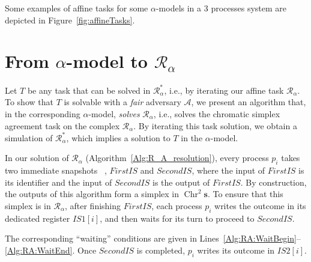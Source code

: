 \documentclass[a4paper]{article}
\newcommand{\remove}[1]{}
\def\A{\ensuremath{\mathcal{A}}}
\def\R{\ensuremath{\mathcal{R}}}
\def\fair{\textit{fair}}
\def\s {\mathbf{s}}
\def\Chr{\operatorname{Chr}}
\begin{document}
Some examples of affine tasks for some $\alpha$-models 
in a 3 processes system are depicted in Figure~\ref{fig:affineTasks}.


\section{From $\alpha$-model to $\R_{\alpha}$} %
\label{sec:R}

Let $T$ be any task that can be solved in $\R_{\alpha}^*$, i.e.,
by iterating our affine task $\R_{\alpha}$.
To show that $T$ is solvable with a {\fair} adversary $\A$, we present
an algorithm that,  in the corresponding
$\alpha$-model, \emph{solves} $\R_{\alpha}$, i.e.,        
solves the chromatic simplex agreement task
on the complex $\R_{\alpha}$.
%
By iterating this task solution, we obtain a simulation of
$\R_{\alpha}^*$, which implies a solution to $T$ in the $\alpha$-model.


In our solution of $\R_{\alpha}$ (Algorithm~\ref{Alg:R_A_resolution}),
every process $p_i$ takes two immediate snapshots ~\cite{BG97},
$\mathit{FirstIS}$ and $\mathit{SecondIS}$, where the input of $\mathit{FirstIS}$ is its identifier and the input of $\mathit{SecondIS}$ is the output of $\mathit{FirstIS}$.
%
By construction, the outputs of this algorithm form a simplex in
$\Chr^2\s$. To ensure that this simplex is in $\R_{\alpha}$,
after finishing $\mathit{FirstIS}$, each process $p_i$ writes the outcome in its dedicated register
$\mathit{IS1}[i]$, and then waits for its turn to proceed to 
$\mathit{SecondIS}$.
%
\remove{
processes execute a first immediate snapshot, 
share their immediate snapshot output and then wait their 
``turn'' before executing the second immediate snapshot.
The structure of the algorithm is quite similar to the one
proposed in~\cite{SHG16}. Indeed, as for the $t$-resilient
case, the $\alpha$-model has a structure allowing to directly
solve $\R_\alpha$ without using simulation techniques as it 
would be the case for a generic adversarial model. The difference
with the solution proposed in~\cite{SHG16} just lies in the
more elaborated conditions which must be satisfied before a 
process is allowed to continue with the second immediate
snapshot. 
}
The corresponding ``waiting'' conditions are given in 
Lines~\ref{Alg:RA:WaitBegin}--\ref{Alg:RA:WaitEnd}.
%
Once $\mathit{SecondIS}$ is completed, $p_i$
writes its outcome in $\mathit{IS2}[i]$. 
\end{document}
